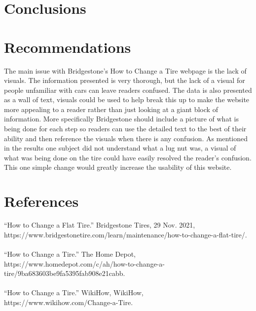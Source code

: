\documentclass[12pt,A4paper]{article}
\begin{document}
	\section{Conclusions}

	\section{Recommendations}
	The main issue with Bridgestone’s How to Change a Tire webpage is the lack of visuals. The information presented is very thorough, but the lack of a visual for people unfamiliar with cars can leave readers confused. The data is also presented as a wall of text, visuals could be used to help break this up to make the website more appealing to a reader rather than just looking at a giant block of information. More specifically Bridgestone should include a picture of what is being done for each step so readers can use the detailed text to the best of their ability and then reference the visuals when there is any confusion. As mentioned in the results one subject did not understand what a lug nut was, a visual of what was being done on the tire could have easily resolved the reader's confusion. This one simple change would greatly increase the usability of this website. 

	\section{References}
	“How to Change a Flat Tire.” Bridgestone Tires, 29 Nov. 2021, https://www.bridgestonetire.com/learn/maintenance/how-to-change-a-flat-tire/.\\ \\
	“How to Change a Tire.” The Home Depot, https://www.homedepot.com/c/ah/how-to-change-a-tire/9ba683603be9fa5395fab908e21cabb.\\ \\
	“How to Change a Tire.” WikiHow, WikiHow, https://www.wikihow.com/Change-a-Tire.\\
\end{document}
